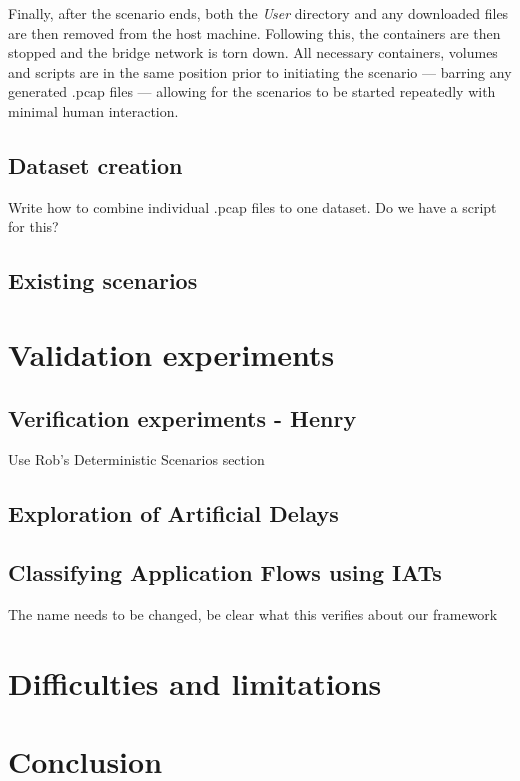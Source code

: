 \documentclass[sigconf,anonymous]{acmart}\usepackage[]{graphicx}\usepackage[]{color}
\begin{document}
    Finally, after the scenario ends, both the \textit{User} directory and any downloaded files are then removed from the host machine. Following this, the containers are then stopped and the bridge network is torn down. All necessary containers, volumes and scripts are in the same position prior to initiating the scenario --- barring any generated .pcap files --- allowing for the scenarios to be started repeatedly with minimal human interaction.
        

\subsection{Dataset creation}
Write how to combine individual .pcap files to one dataset. Do we have a script for this?

\subsection{Existing scenarios}


\section{Validation experiments}

\subsection{Verification experiments - Henry}

Use Rob's Deterministic Scenarios section

\subsection{Exploration of Artificial Delays}

\subsection{Classifying Application Flows using IATs}
The name needs to be changed, be clear what this verifies about our framework


\section{Difficulties and limitations}

\section{Conclusion}
\end{document}
